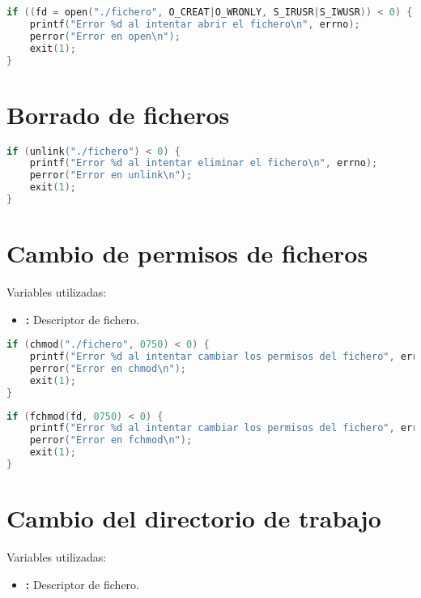 \begin{lstlisting}[language=C]
if ((fd = open("./fichero", O_CREAT|O_WRONLY, S_IRUSR|S_IWUSR)) < 0) {
	printf("Error %d al intentar abrir el fichero\n", errno);
	perror("Error en open\n");
	exit(1);
}
\end{lstlisting}

\pagebreak

\section{Borrado de ficheros}

\begin{lstlisting}[language=C]
if (unlink("./fichero") < 0) {
	printf("Error %d al intentar eliminar el fichero\n", errno);
	perror("Error en unlink\n");
	exit(1);
}
\end{lstlisting}

\section{Cambio de permisos de ficheros}

Variables utilizadas:

\begin{itemize}
	\item{}\textbf{:} Descriptor de fichero.
\end{itemize}

\begin{lstlisting}[language=C]
if (chmod("./fichero", 0750) < 0) {
	printf("Error %d al intentar cambiar los permisos del fichero", errno);
	perror("Error en chmod\n");
	exit(1);
}
\end{lstlisting}

\begin{lstlisting}[language=C]
if (fchmod(fd, 0750) < 0) {
	printf("Error %d al intentar cambiar los permisos del fichero", errno);
	perror("Error en fchmod\n");
	exit(1);
}
\end{lstlisting}

\section{Cambio del directorio de trabajo}

Variables utilizadas:

\begin{itemize}
	\item{}\textbf{:} Descriptor de fichero.
\end{itemize}

